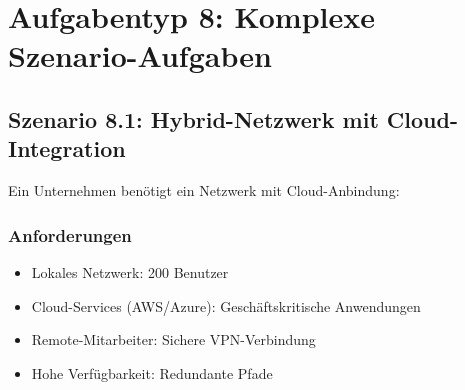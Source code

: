 \documentclass[12pt,a4paper,german]{report}
\begin{document}
\chapter{Aufgabentyp 8: Komplexe Szenario-Aufgaben}

\section{Szenario 8.1: Hybrid-Netzwerk mit Cloud-Integration}

Ein Unternehmen benötigt ein Netzwerk mit Cloud-Anbindung:

\subsection{Anforderungen}
\begin{itemize}
    \item Lokales Netzwerk: 200 Benutzer
    \item Cloud-Services (AWS/Azure): Geschäftskritische Anwendungen
    \item Remote-Mitarbeiter: Sichere VPN-Verbindung
    \item Hohe Verfügbarkeit: Redundante Pfade
\end{itemize}
\end{document}
